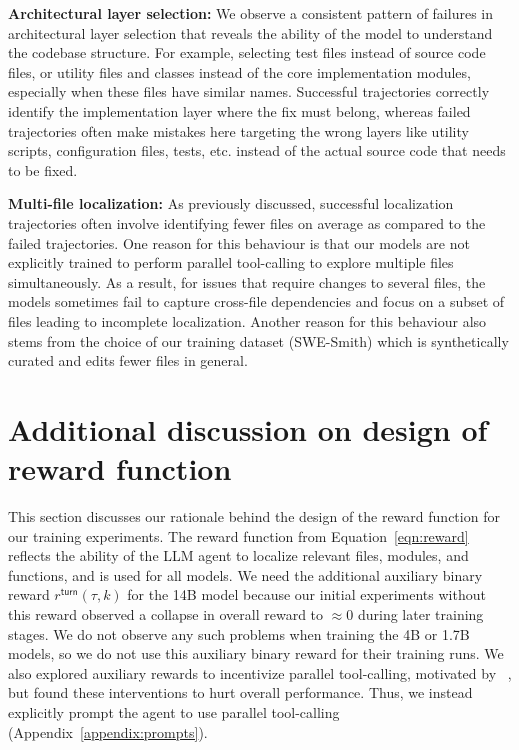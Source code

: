 \textbf{Architectural layer selection:} We observe a consistent pattern of failures in architectural layer selection that reveals the ability of the model to understand the codebase structure. For example, selecting test files instead of source code files, or utility files and classes instead of the core implementation modules, especially when these files have similar names. Successful trajectories correctly identify the implementation layer where the fix must belong, whereas failed trajectories often make mistakes here targeting the wrong layers like utility scripts, configuration files, tests, etc. instead of the actual source code that needs to be fixed.

\textbf{Multi-file localization:} As previously discussed, successful localization trajectories often involve identifying fewer files on average as compared to the failed trajectories. One reason for this behaviour is that our models are not explicitly trained to perform parallel tool-calling to explore multiple files simultaneously. As a result, for issues that require changes to several files, the models sometimes fail to capture cross-file dependencies and focus on a subset of files leading to incomplete localization. Another reason for this behaviour also stems from the choice of our training dataset (SWE-Smith) which is synthetically curated and edits fewer files in general.

\section{Additional discussion on design of reward function}\label{appendix:reward_function}
This section discusses our rationale behind the design of the reward function for our training experiments. The reward function from Equation~\ref{eqn:reward} reflects the ability of the LLM agent to localize relevant files, modules, and functions, and is used for all \methodname models. We need the additional auxiliary binary reward $r^{\mathsf{turn}}(\tau, k)$ for the 14B model because our initial experiments without this reward observed a collapse in overall reward to $\approx$0 during later training stages. We do not observe any such problems when training the 4B or 1.7B models, so we do not use this auxiliary binary reward for their training runs. We also explored auxiliary rewards to incentivize parallel tool-calling, motivated by ~\citet{cognition2025swegrep}, but found these interventions to hurt overall performance. Thus, we instead explicitly prompt the agent to use parallel tool-calling (Appendix~\ref{appendix:prompts}). 

